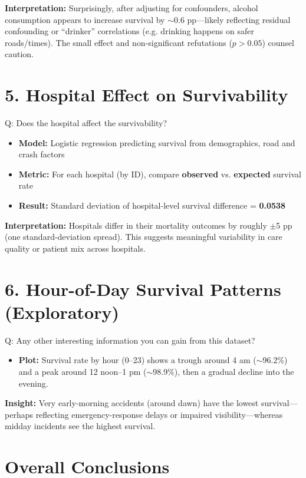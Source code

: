 \documentclass[a4paper]{article}
\begin{document}
\textbf{Interpretation:} Surprisingly, after adjusting for confounders, alcohol consumption appears to increase survival by $\sim$0.6 pp—likely reflecting residual confounding or ``drinker'' correlations (e.g. drinking happens on safer roads/times). The small effect and non-significant refutations ($p > 0.05$) counsel caution.

\section*{5. Hospital Effect on Survivability}
Q: Does the hospital affect the survivability?

\begin{itemize}
    \item \textbf{Model:} Logistic regression predicting survival from demographics, road and crash factors
    \item \textbf{Metric:} For each hospital (by ID), compare \textbf{observed} vs. \textbf{expected} survival rate
    \item \textbf{Result:} Standard deviation of hospital-level survival difference = \textbf{0.0538}
\end{itemize}

\textbf{Interpretation:} Hospitals differ in their mortality outcomes by roughly $\pm$5 pp (one standard-deviation spread). This suggests meaningful variability in care quality or patient mix across hospitals.

\section*{6. Hour-of-Day Survival Patterns (Exploratory)}
Q: Any other interesting information you can gain from this dataset?

\begin{itemize}
    \item \textbf{Plot:} Survival rate by hour (0--23) shows a trough around 4 am ($\sim$96.2\%) and a peak around 12 noon--1 pm ($\sim$98.9\%), then a gradual decline into the evening.
\end{itemize}

\textbf{Insight:} Very early-morning accidents (around dawn) have the lowest survival—perhaps reflecting emergency-response delays or impaired visibility—whereas midday incidents see the highest survival.

\section*{Overall Conclusions}
\end{document}

